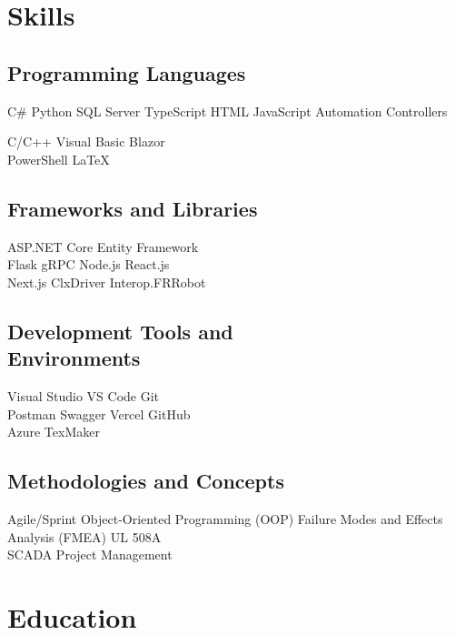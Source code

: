 \documentclass{TaylorTurnerResume2023}
\begin{document}
\hfill
\begin{minipage}[t]{0.275\textwidth} 

\section{Skills}

\subsection{Programming Languages}
  \textbullet{} C\#
  \textbullet{} Python
  \textbullet{} SQL Server
  \textbullet{} TypeScript
  \textbullet{} HTML
  \textbullet{} JavaScript
  \textbullet{} Automation Controllers
  
  \textbullet{} C/C++
  \textbullet{} Visual Basic
  \textbullet{} Blazor \\
  \textbullet{} PowerShell
  \textbullet{} \LaTeX
\sectionsep
\subsection{Frameworks and Libraries}
  \textbullet{} ASP.NET Core
  \textbullet{} Entity Framework \\
  \textbullet{} Flask
  \textbullet{} gRPC
  \textbullet{} Node.js
  \textbullet{} React.js \\
  \textbullet{} Next.js
  \textbullet{} ClxDriver
  \textbullet{} Interop.FRRobot
\sectionsep
\subsection{Development Tools and \\ Environments}
  \textbullet{} Visual Studio
  \textbullet{} VS Code
  \textbullet{} Git \\
  \textbullet{} Postman
  \textbullet{} Swagger
  \textbullet{} Vercel
  \textbullet{} GitHub \\
  \textbullet{} Azure
  \textbullet{} TexMaker
\sectionsep
\subsection{Methodologies and Concepts}
  \textbullet{} Agile/Sprint
  \textbullet{} Object-Oriented Programming (OOP)
  \textbullet{} Failure Modes and Effects Analysis (FMEA)
  \textbullet{} UL 508A \\
  \textbullet{} SCADA
  \textbullet{} Project Management
\sectionsep
\sectionsep
\section{Education} 

\end{minipage}
\end{document}
